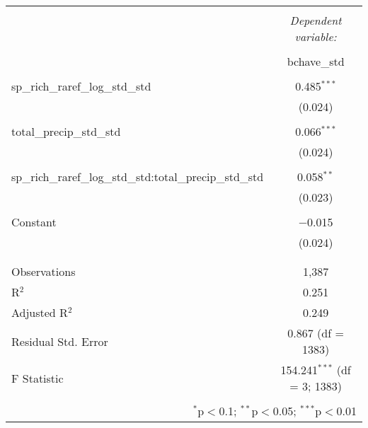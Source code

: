 
\begin{table}[!htbp] \centering 
  \caption{} 
  \label{} 
\begin{tabular}{@{\extracolsep{5pt}}lc} 
\\[-1.8ex]\hline 
\hline \\[-1.8ex] 
 & \multicolumn{1}{c}{\textit{Dependent variable:}} \\ 
\cline{2-2} 
\\[-1.8ex] & bchave\_std \\ 
\hline \\[-1.8ex] 
 sp\_rich\_raref\_log\_std\_std & 0.485$^{***}$ \\ 
  & (0.024) \\ 
  & \\ 
 total\_precip\_std\_std & 0.066$^{***}$ \\ 
  & (0.024) \\ 
  & \\ 
 sp\_rich\_raref\_log\_std\_std:total\_precip\_std\_std & 0.058$^{**}$ \\ 
  & (0.023) \\ 
  & \\ 
 Constant & $-$0.015 \\ 
  & (0.024) \\ 
  & \\ 
\hline \\[-1.8ex] 
Observations & 1,387 \\ 
R$^{2}$ & 0.251 \\ 
Adjusted R$^{2}$ & 0.249 \\ 
Residual Std. Error & 0.867 (df = 1383) \\ 
F Statistic & 154.241$^{***}$ (df = 3; 1383) \\ 
\hline 
\hline \\[-1.8ex] 
\multicolumn{2}{r}{$^{*}$p$<$0.1; $^{**}$p$<$0.05; $^{***}$p$<$0.01} \\ 
\end{tabular} 
\end{table} 
